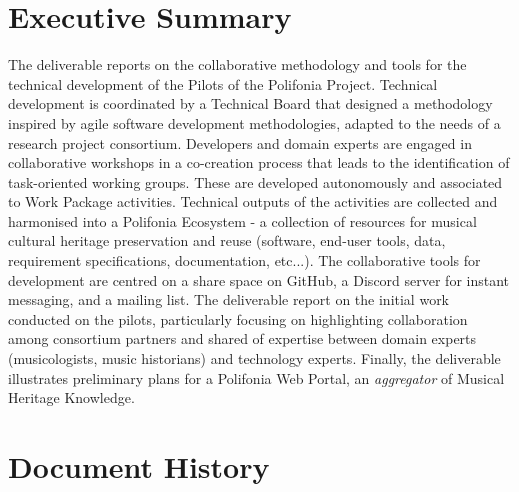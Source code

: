\section*{Executive Summary}
The deliverable reports on the collaborative methodology and tools for the technical development of the Pilots of the Polifonia Project.
Technical development is coordinated by a Technical Board that designed a methodology inspired by agile software development methodologies, adapted to the needs of a research project consortium.
Developers and domain experts are engaged in collaborative workshops in a co-creation process that leads to the identification of task-oriented working groups. 
These are developed autonomously and associated to Work Package activities.
Technical outputs of the activities are collected and harmonised into a Polifonia Ecosystem - a collection of resources for musical cultural heritage preservation and reuse (software, end-user tools, data, requirement specifications, documentation, etc...).
The collaborative tools for development are centred on a share space on GitHub, a Discord server for instant messaging, and a mailing list.
The deliverable report on the initial work conducted on the pilots, particularly focusing on highlighting collaboration among consortium partners and shared of expertise between domain experts (musicologists, music historians) and technology experts.
Finally, the deliverable illustrates preliminary plans for a Polifonia Web Portal, an \textit{aggregator} of Musical Heritage Knowledge.
\clearpage

\pagestyle{empty}


\section*{Document History}

